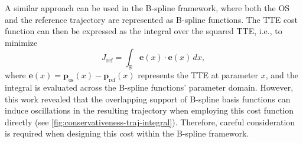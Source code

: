 A similar approach can be used in the B-spline framework, where both the OS and the reference trajectory are represented as B-spline functions. The TTE cost function can then be expressed as the integral over the squared TTE, i.e., to minimize
\begin{equation}\label{eq:total-track-error-b-spline}
J_\text{ref} = \int_\mathbb R \mathbf e(x) \cdot \mathbf e(x) \, dx,
\end{equation}
where $\mathbf e(x) = \mathbf p_\text{os}(x) - \mathbf p_\text{ref}(x)$ represents the TTE at parameter $x$, and the integral is evaluated across the B-spline functions' parameter domain. However, this work revealed that the overlapping support of B-spline basis functions can induce oscillations in the resulting trajectory when employing this cost function directly (see \cref{fig:conservativeness-traj-integral}). Therefore, careful consideration is required when designing this cost within the B-spline framework.

